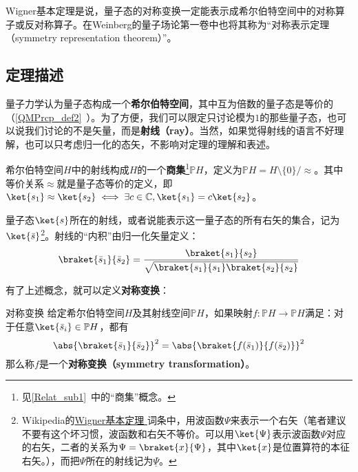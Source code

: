 





Wigner基本定理是说，量子态的对称变换一定能表示成希尔伯特空间中的对称算子或反对称算子。在Weinberg的量子场论第一卷\cite{WeinbergQFT1}中也将其称为“对称表示定理（symmetry representation theorem）”。

\subsection{定理描述}

量子力学认为量子态构成一个\textbf{希尔伯特空间}，其中互为倍数的量子态是等价的（\autoref{QMPrcp_def2}~）。为了方便，我们可以限定只讨论模为$1$的那些量子态，也可以说我们讨论的不是矢量，而是\textbf{射线（ray）}。当然，如果觉得射线的语言不好理解，也可以只考虑归一化的态矢，不影响对定理的理解和表述。

希尔伯特空间$H$中的射线构成$H$的一个\textbf{商集}\footnote{见\autoref{Relat_sub1}~中的“商集”概念。}$\mathbb{P}H$，定义为${\displaystyle \mathbb {P} H=H\setminus \{0\}/{\approx }}$。其中等价关系$\approx$就是量子态等价的定义，即$\ket{s_1}\approx\ket{s_2}\iff \exists c\in\mathbb{C}, \ket{s_1}=c\ket{s_2}$。

量子态$\ket{s}$所在的射线，或者说能表示这一量子态的所有右矢的集合，记为$\ket{\bar{s}}$\footnote{Wikipedia的\href{https://en.wikipedia.org/wiki/Wigner_theorem}{Wigner基本定理
}词条中，用波函数$\Psi$来表示一个右矢（笔者建议不要有这个坏习惯，波函数和右矢不等价。可以用$\ket{\Psi}$表示波函数$\Psi$对应的右矢，二者的关系为$\Psi=\braket{x}{\Psi}$，其中$\ket{x}$是位置算符的本征右矢。），而把$\Psi$所在的射线记为$\underline{\Psi}$。}。射线的“内积”由归一化矢量定义：
\begin{equation}
\braket{\bar{s}_1}{\bar{s}_2} = \frac{\braket{s_1}{s_2}}{\sqrt{\braket{s_1}{s_1}\braket{s_2}{s_2}}}
\end{equation}

有了上述概念，就可以定义\textbf{对称变换}：

\begin{definition}{对称变换}\label{WigThe_def1}
给定希尔伯特空间$H$及其射线空间$\mathbb{P}H$，如果映射$f:\mathbb{P}H\to\mathbb{P}H$满足：对于任意$\ket{\bar{s}_i}\in\mathbb{P}H$，都有
\begin{equation}\label{WigThe_eq1}
\abs{\braket{\bar{s}_1}{\bar{s}_2}}^2 = \abs{\braket{f(\bar{s}_1)}{f(\bar{s}_2)}}^2
\end{equation}
那么称$f$是一个\textbf{对称变换（symmetry transformation）}。
\end{definition}

